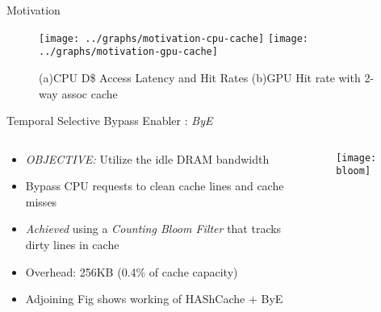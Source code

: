 \documentclass[final,t]{beamer}
\newcommand*\circled[1]{\tikz[baseline=(char.base)]{
            \node[shape=circle,draw,inner sep=2pt] (char) {#1};}}
\begin{document}
\begin{frame}[t,fragile]{}
\begin{columns}[t]
\begin{column}{.47\linewidth}
\begin{exampleblock}{Motivation}
    \begin{figure}
       \texttt{[image: ../graphs/motivation-cpu-cache]}
       \texttt{[image: ../graphs/motivation-gpu-cache]}
       \caption{(a)CPU D\$ Access Latency and Hit Rates (b)GPU Hit rate with 2-way assoc cache}
       \label{fig:motivation-cpu-cache}
    \end{figure}  

    \end{exampleblock}
     

    \begin{exampleblock}{\circled{3} Temporal Selective Bypass Enabler : \textit{ByE}}
    	\begin{columns} [T]
    		\begin{column}{0.6\linewidth}
    	    \begin{itemize}
    	    	\item \emph{OBJECTIVE:} Utilize the idle DRAM bandwidth
    	    	\item Bypass CPU requests to clean cache lines and cache misses
    	    	\item \emph{Achieved} using a \textit{Counting Bloom Filter} that tracks dirty lines in cache
    	    	\item Overhead: 256KB (0.4\% of cache capacity)
			    \item Adjoining Fig shows working of HAShCache + ByE
    	    \end{itemize}     			
    		\end{column}
    		\begin{column}{0.4\linewidth}
    			\begin{figure}
					\centering
    			    \texttt{[image: bloom]}
    			\end{figure}
    	    \end{column}
    	\end{columns}
	\end{exampleblock}
	

\end{column}
\end{columns}
\end{frame}
\end{document}
